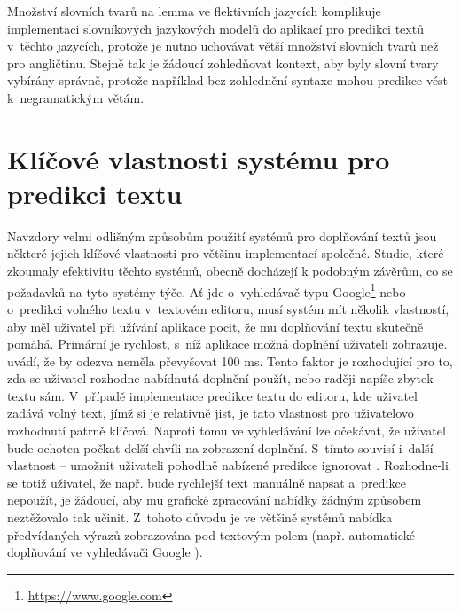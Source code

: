 \documentclass[a4paper,11pt,openany]{book} %
\begin{document}

Množství slovních tvarů na lemma ve flektivních jazycích komplikuje implementaci slovníkových jazykových modelů do aplikací pro predikci textů v~těchto jazycích, protože je nutno uchovávat větší množství slovních tvarů než pro angličtinu. Stejně tak je žádoucí zohledňovat kontext, aby byly slovní tvary vybírány správně, protože například bez zohlednění syntaxe mohou predikce vést k~negramatickým větám. \parencite[5234--5235]{ghayoomi2009overview}

\chapter{Klíčové vlastnosti systému pro predikci textu}

Navzdory velmi odlišným způsobům použití systémů pro doplňování textů jsou některé jejich klíčové vlastnosti pro většinu implementací společné. Studie, které zkoumaly efektivitu těchto systémů, obecně docházejí k podobným závěrům, co se požadavků na tyto systémy týče. Ať jde o~vyhledávač typu Google\footnote{\url{https://www.google.com}} nebo o~predikci volného textu v~textovém editoru, musí systém mít několik vlastností, aby měl uživatel při užívání aplikace pocit, že mu doplňování textu skutečně pomáhá.  Primární je rychlost, s~níž aplikace možná doplnění uživateli zobrazuje. \textcite{nandi2007assisted} uvádí, že by odezva neměla převyšovat 100 ms. Tento faktor je rozhodující pro to, zda se uživatel rozhodne nabídnutá doplnění použít, nebo raději napíše zbytek textu sám. V~případě implementace predikce textu do editoru, kde uživatel zadává volný text, jímž si je relativně jist, je tato vlastnost pro uživatelovo rozhodnutí patrně klíčová. Naproti tomu ve vyhledávání lze očekávat, že uživatel bude ochoten počkat delší chvíli na zobrazení doplnění. S~tímto souvisí i~další vlastnost -- umožnit uživateli pohodlně nabízené predikce ignorovat \parencite{ward2012autocomplete}. Rozhodne-li se totiž uživatel, že např. bude rychlejší text manuálně napsat a~predikce nepoužít, je žádoucí, aby mu grafické zpracování nabídky žádným způsobem neztěžovalo tak učinit. Z~tohoto důvodu je ve většině systémů nabídka předvídaných výrazů zobrazována pod textovým polem (např. automatické doplňování ve vyhledávači Google \parencite{google2015}). 
\end{document}
